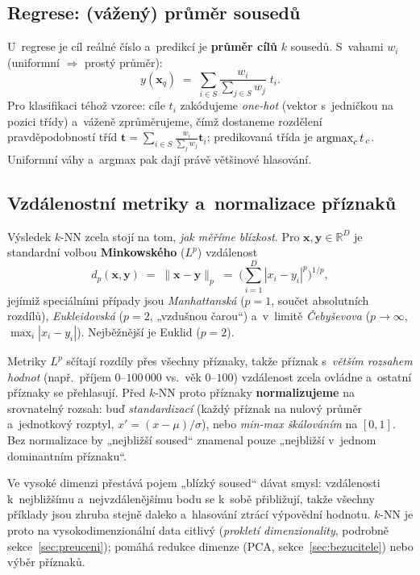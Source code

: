 \subsection{Regrese: (vážený) průměr sousedů}

U~regrese je cíl reálné číslo a~predikcí je \textbf{průměr cílů} $k$ sousedů. S~vahami $w_i$ (uniformní $\Rightarrow$ prostý průměr):
\[
  y(\mathbf{x}_q) \;=\; \sum_{i\in S} \frac{w_i}{\sum_{j\in S} w_j}\; t_i .
\]
Pro klasifikaci téhož vzorce: cíle $t_i$ zakódujeme \emph{one-hot} (vektor s~jedničkou na pozici třídy) a~váženě zprůměrujeme, čímž dostaneme rozdělení pravděpodobností tříd $\mathbf{t}=\sum_{i\in S}\frac{w_i}{\sum_j w_j}\mathbf{t}_i$; predikovaná třída je $\operatorname*{argmax}_c t_{\,c}$. Uniformní váhy a~argmax pak dají právě většinové hlasování.

\subsection{Vzdálenostní metriky a~normalizace příznaků}

Výsledek $k$-NN zcela stojí na tom, \emph{jak měříme blízkost}. Pro $\mathbf{x},\mathbf{y}\in\mathbb{R}^D$ je standardní volbou \textbf{Minkowského} ($L^p$) vzdálenost
\[
  d_p(\mathbf{x},\mathbf{y}) \;=\; \|\mathbf{x}-\mathbf{y}\|_p \;=\; \Big(\sum_{i=1}^{D} |x_i-y_i|^p\Big)^{1/p},
\]
jejímiž speciálními případy jsou \emph{Manhattanská} ($p=1$, součet absolutních rozdílů), \emph{Eukleidovská} ($p=2$, „vzdušnou čarou``) a~v~limitě \emph{Čebyševova} ($p\to\infty$, $\max_i |x_i-y_i|$). Nejběžnější je Euklid ($p=2$).

\begin{intuice}
Metriky $L^p$ sčítají rozdíly přes všechny příznaky, takže příznak s~\emph{větším rozsahem hodnot} (např.\ příjem $0$--$100\,000$ vs.\ věk $0$--$100$) vzdálenost zcela ovládne a~ostatní příznaky se přehlasují. Před $k$-NN proto příznaky \textbf{normalizujeme} na srovnatelný rozsah: buď \emph{standardizací} (každý příznak na nulový průměr a~jednotkový rozptyl, $x'\!=\!(x-\mu)/\sigma$), nebo \emph{min-max škálováním} na $[0,1]$. Bez normalizace by „nejbližší soused`` znamenal pouze „nejbližší v~jednom dominantním příznaku``.
\end{intuice}

\begin{poznamka}
Ve vysoké dimenzi přestává pojem „blízký soused`` dávat smysl: vzdálenosti k~nejbližšímu a~nejvzdálenějšímu bodu se k~sobě přibližují, takže všechny příklady jsou zhruba stejně daleko a~hlasování ztrácí výpovědní hodnotu. $k$-NN je proto na vysokodimenzionální data citlivý (\emph{prokletí dimenzionality}, podrobně sekce~\ref{sec:preuceni}); pomáhá redukce dimenze (PCA, sekce~\ref{sec:bezucitele}) nebo výběr příznaků.
\end{poznamka}

